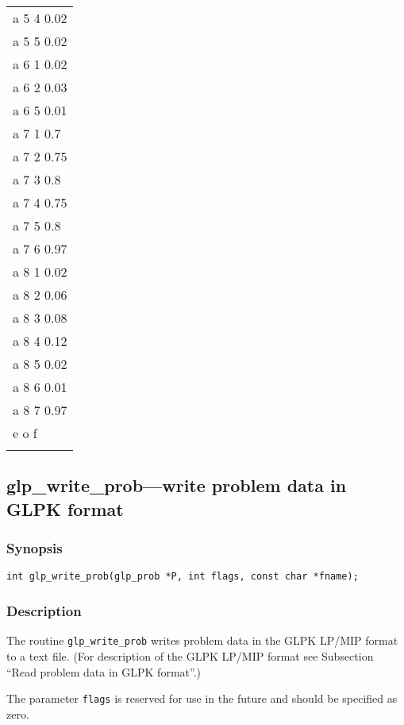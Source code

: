 \begin{center}
\begin{tabular}{|@{\hspace*{80pt}}l}
a 5 4 0.02        \\
a 5 5 0.02        \\
a 6 1 0.02        \\
a 6 2 0.03        \\
a 6 5 0.01        \\
a 7 1 0.7         \\
a 7 2 0.75        \\
a 7 3 0.8         \\
a 7 4 0.75        \\
a 7 5 0.8         \\
a 7 6 0.97        \\
a 8 1 0.02        \\
a 8 2 0.06        \\
a 8 3 0.08        \\
a 8 4 0.12        \\
a 8 5 0.02        \\
a 8 6 0.01        \\
a 8 7 0.97        \\
e o f             \\
\\
\end{tabular}
\end{center}

\newpage

\subsection{glp\_write\_prob---write problem data in GLPK format}

\subsubsection*{Synopsis}

\begin{verbatim}
int glp_write_prob(glp_prob *P, int flags, const char *fname);
\end{verbatim}

\subsubsection*{Description}

The routine \verb|glp_write_prob| writes problem data in the GLPK
LP/MIP format to a text file. (For description of the GLPK LP/MIP
format see Subsection ``Read problem data in GLPK format''.)

The parameter \verb|flags| is reserved for use in the future and should
be specified as zero.

